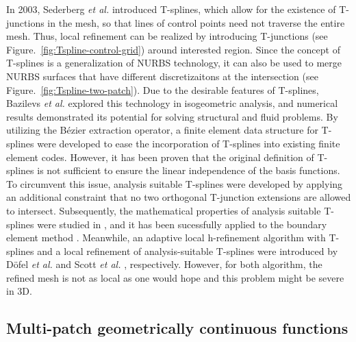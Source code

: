 In 2003, Sederberg \textit{et al.} \cite{sederberg_t-splines_2003} introduced T-splines, which allow for the existence of T-junctions in the mesh, so that lines of control points need not traverse the entire mesh. Thus, local refinement can be realized by introducing T-junctions (see Figure.~\ref{fig:Tspline-control-grid}) around interested region. Since the concept of T-splines is a generalization of NURBS technology, it can also be used to merge NURBS surfaces that have different discretizaitons at the intersection (see Figure.~\ref{fig:Tspline-two-patch}). Due to the desirable features of T-splines, Bazilevs \textit{et al.} \cite{bazilevs_isogeometric_2010} explored this technology in isogeometric analysis, and numerical results demonstrated its potential for solving structural and fluid problems. By utilizing the B\'ezier extraction operator, a finite element data structure for T-splines \cite{scott_isogeometric_2011} were developed to ease the incorporation of T-splines into existing finite element codes. However, it has been proven \cite{buffa_linear_2010} that the original definition of T-splines is not sufficient to ensure the linear independence of the basis functions. To circumvent this issue, analysis suitable T-splines \cite{li_linear_2012} were developed by applying an additional constraint that no two orthogonal T-junction extensions are allowed to intersect. Subsequently, the mathematical properties of analysis suitable T-splines were studied in \cite{li_analysis-suitable_2013,xin_li_properties_2015}, and it has been sucessfully applied to the boundary element method \cite{scott2013isogeometric}. Meanwhile, an adaptive local h-refinement algorithm with T-splines and a local refinement of analysis-suitable T-splines were introduced by D\"{o}fel \textit{et al.} \cite{dorfel_adaptive_2010} and Scott \textit{et al.} \cite{scott_local_2012}, respectively. However, for both algorithm, the refined mesh is not as local as one would hope and this problem might be severe in 3D.\par

\subsection{Multi-patch geometrically continuous functions}

